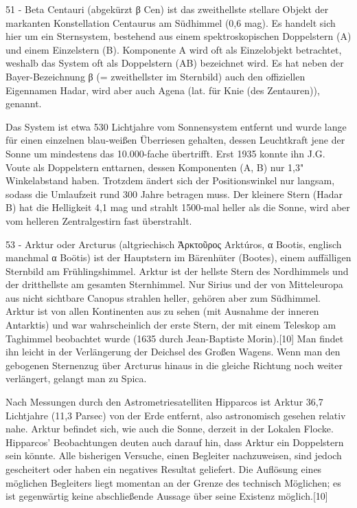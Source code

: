 51 - Beta Centauri (abgekürzt β Cen) ist das zweithellste stellare Objekt der markanten Konstellation Centaurus am Südhimmel (0,6 mag). Es handelt sich hier um ein Sternsystem, bestehend aus einem spektroskopischen Doppelstern (A) und einem Einzelstern (B). Komponente A wird oft als Einzelobjekt betrachtet, weshalb das System oft als Doppelstern (AB) bezeichnet wird. Es hat neben der Bayer-Bezeichnung β (= zweithellster im Sternbild) auch den offiziellen Eigennamen Hadar, wird aber auch Agena (lat. für Knie (des Zentauren)), genannt.

Das System ist etwa 530 Lichtjahre vom Sonnensystem entfernt und wurde lange für einen einzelnen blau-weißen Überriesen gehalten, dessen Leuchtkraft jene der Sonne um mindestens das 10.000-fache übertrifft. Erst 1935 konnte ihn J.G. Voute als Doppelstern enttarnen, dessen Komponenten (A, B) nur 1,3" Winkelabstand haben. Trotzdem ändert sich der Positionswinkel nur langsam, sodass die Umlaufzeit rund 300 Jahre betragen muss. Der kleinere Stern (Hadar B) hat die Helligkeit 4,1 mag und strahlt 1500-mal heller als die Sonne, wird aber vom helleren Zentralgestirn fast überstrahlt. 




53 - Arktur oder Arcturus (altgriechisch Ἀρκτοῦρος Arktúros, α Bootis, englisch manchmal α Boötis) ist der Hauptstern im Bärenhüter (Bootes), einem auffälligen Sternbild am Frühlingshimmel. Arktur ist der hellste Stern des Nordhimmels und der dritthellste am gesamten Sternhimmel. Nur Sirius und der von Mitteleuropa aus nicht sichtbare Canopus strahlen heller, gehören aber zum Südhimmel. Arktur ist von allen Kontinenten aus zu sehen (mit Ausnahme der inneren Antarktis) und war wahrscheinlich der erste Stern, der mit einem Teleskop am Taghimmel beobachtet wurde (1635 durch Jean-Baptiste Morin).[10] Man findet ihn leicht in der Verlängerung der Deichsel des Großen Wagens. Wenn man den gebogenen Sternenzug über Arcturus hinaus in die gleiche Richtung noch weiter verlängert, gelangt man zu Spica.

Nach Messungen durch den Astrometriesatelliten Hipparcos ist Arktur 36,7 Lichtjahre (11,3 Parsec) von der Erde entfernt, also astronomisch gesehen relativ nahe. Arktur befindet sich, wie auch die Sonne, derzeit in der Lokalen Flocke. Hipparcos’ Beobachtungen deuten auch darauf hin, dass Arktur ein Doppelstern sein könnte. Alle bisherigen Versuche, einen Begleiter nachzuweisen, sind jedoch gescheitert oder haben ein negatives Resultat geliefert. Die Auflösung eines möglichen Begleiters liegt momentan an der Grenze des technisch Möglichen; es ist gegenwärtig keine abschließende Aussage über seine Existenz möglich.[10]

